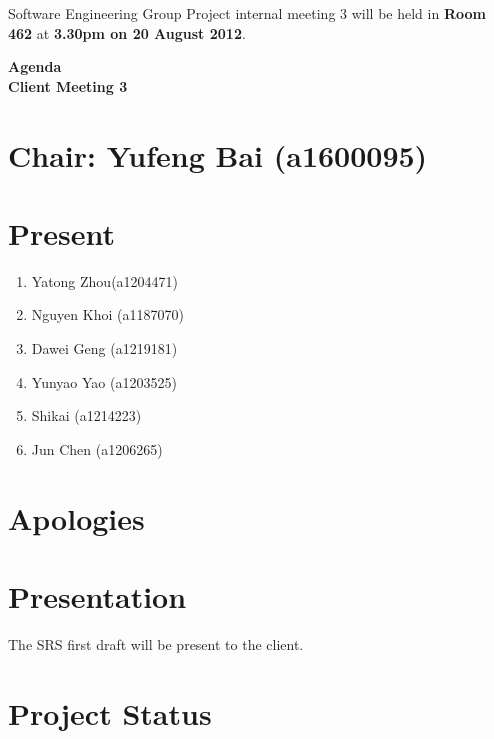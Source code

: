 \documentclass[11pt, a4paper]{article}
\begin{document}
\noindent Software Engineering Group Project internal meeting 3 will be held in {\bf Room 462} at {\bf 3.30pm on 20 August 2012}.


\vspace*{15pt}

\begin{center}
\huge \bf Agenda \\Client Meeting 3
\end{center}



\section*{Chair: Yufeng Bai (a1600095)}
\section*{Present}
\begin{enumerate}
\item Yatong Zhou(a1204471)
\item Nguyen Khoi (a1187070)
\item Dawei Geng (a1219181)
\item Yunyao Yao (a1203525)
\item Shikai (a1214223)
\item Jun Chen (a1206265)
\end{enumerate}
\section{Apologies}

\section{Presentation}
The SRS first draft will be present to the client.

\section{Project Status}
\end{document}
